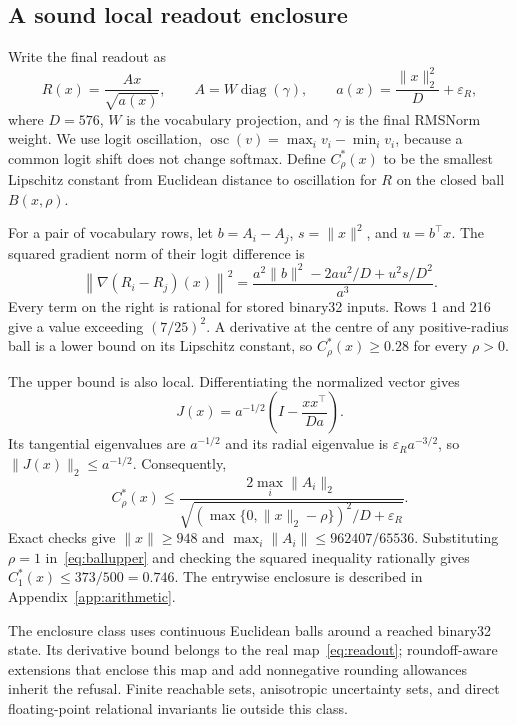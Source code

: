 \documentclass[10pt]{article}
\theoremstyle{definition}\newtheorem{definition}[theorem]{Definition}
\newcommand{\osc}{\operatorname{osc}}
\begin{document}
\subsection{A sound local readout enclosure}
Write the final readout as
\begin{equation}\label{eq:readout}
 R(x)=\frac{A x}{\sqrt{a(x)}},\qquad
 A=W\operatorname{diag}(\gamma),\qquad
 a(x)=\frac{\|x\|_2^2}{D}+\varepsilon_R,
\end{equation}
where $D=576$, $W$ is the vocabulary projection, and $\gamma$ is the final RMSNorm weight. We use logit oscillation, $\osc(v)=\max_i v_i-\min_i v_i$, because a common logit shift does not change softmax. Define $C_\rho^*(x)$ to be the smallest Lipschitz constant from Euclidean distance to oscillation for $R$ on the closed ball $B(x,\rho)$.

For a pair of vocabulary rows, let $b=A_i-A_j$, $s=\|x\|^2$, and $u=b^\top x$. The squared gradient norm of their logit difference is
\begin{equation}\label{eq:gradient}
 \left\|\nabla(R_i-R_j)(x)\right\|^2
 =\frac{a^2\|b\|^2-2au^2/D+u^2s/D^2}{a^3}.
\end{equation}
Every term on the right is rational for stored binary32 inputs. Rows 1 and 216 give a value exceeding $(7/25)^2$. A derivative at the centre of any positive-radius ball is a lower bound on its Lipschitz constant, so $C_\rho^*(x)\geq0.28$ for every $\rho>0$.

The upper bound is also local. Differentiating the normalized vector gives
\[
 J(x)=a^{-1/2}\left(I-\frac{xx^\top}{Da}\right).
\]
Its tangential eigenvalues are $a^{-1/2}$ and its radial eigenvalue is $\varepsilon_R a^{-3/2}$, so $\|J(x)\|_2\leq a^{-1/2}$. Consequently,
\begin{equation}\label{eq:ballupper}
 C_\rho^*(x)\leq
 \frac{2\max_i\|A_i\|_2}
 {\sqrt{(\max\{0,\|x\|_2-\rho\})^2/D+\varepsilon_R}}.
\end{equation}
Exact checks give $\|x\|\geq948$ and $\max_i\|A_i\|\leq962407/65536$. Substituting $\rho=1$ in~\eqref{eq:ballupper} and checking the squared inequality rationally gives $C_1^*(x)\leq373/500=0.746$. The entrywise enclosure is described in Appendix~\ref{app:arithmetic}.

The enclosure class uses continuous Euclidean balls around a reached binary32 state. Its derivative bound belongs to the real map~\eqref{eq:readout}; roundoff-aware extensions that enclose this map and add nonnegative rounding allowances inherit the refusal. Finite reachable sets, anisotropic uncertainty sets, and direct floating-point relational invariants lie outside this class.
\end{document}
